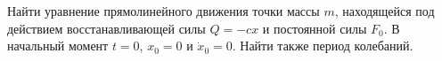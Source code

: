 Найти уравнение прямолинейного движения точки массы $m$, находящейся
под действием восстанавливающей силы $Q=-cx$ и постоянной силы $F_{0}$.
В начальный момент $t=0$, $x_{0}=0$ и $\dot x_{0}=0$. Найти также период колебаний.
